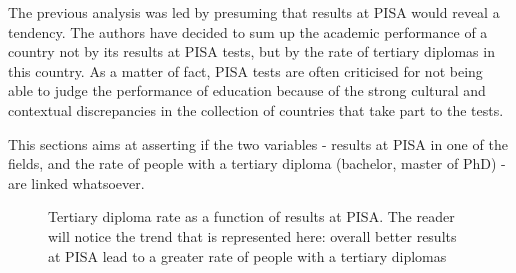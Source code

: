 \documentclass[12pt,a4paper]{article}
\begin{document}
The previous analysis was led by presuming that results at PISA would reveal a tendency. The authors have decided to sum up the academic performance of a country not by its results at PISA tests, but by the rate of tertiary diplomas in this country. As a matter of fact, PISA tests are often criticised for not being able to judge the performance of education because of the strong cultural and contextual discrepancies in the collection of countries that take part to the tests.

This sections aims at asserting if the two variables - results at PISA in one of the fields, and the rate of people with a tertiary diploma (bachelor, master of PhD) - are linked whatsoever.

\begin{figure}
	\centering
	\label{3DRate}
	\caption{Tertiary diploma rate as a function of results at PISA. The reader will notice the trend that is represented here: overall better results at PISA lead to a greater rate of people with a tertiary diplomas}

\end{figure}
\end{document}
